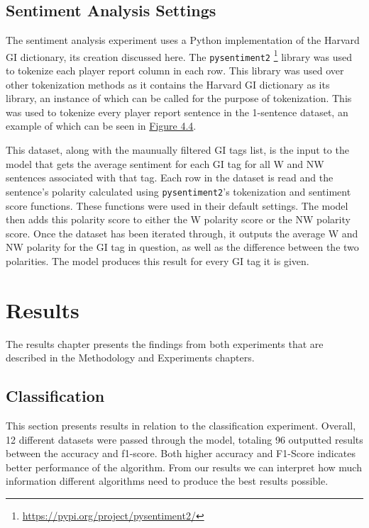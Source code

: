 \documentclass[oneside,12pt]{Classes/RoboticsLaTeX}
\begin{document}
\section{Sentiment Analysis Settings}
The sentiment analysis experiment uses a Python implementation of the Harvard GI dictionary, its creation discussed here. The \texttt{pysentiment2} \footnote{\url{https://pypi.org/project/pysentiment2/}} library was used to tokenize each player report column in each row. This library was used over other tokenization
methods as it contains the Harvard GI dictionary as its library, an instance of which can be called for the purpose of tokenization. This was used to tokenize every player report sentence in the 1-sentence dataset, an example of which can be seen in  \hyperref[fig:1-sentence_gi_tag_example]{Figure 4.4}. \par
This dataset, along with the maunually filtered GI tags list, is the input to the model that gets the average sentiment for each GI tag for all W and NW sentences associated with that tag. Each row in the dataset is read and the sentence's polarity calculated using \texttt{pysentiment2}'s tokenization and sentiment score
functions. These functions were used in their default settings. The model then adds this polarity score to either the W polarity score or the NW polarity score. Once the dataset has been iterated through, it outputs the average W and NW polarity for the GI tag in question, as well as the difference between the two polarities. 
The model produces this result for every GI tag it is given.

\chapter{Results}
\label{chap:results}
The results chapter presents the findings from both experiments that are described in the Methodology and Experiments chapters.
\section{Classification}
This section presents results in relation to the classification experiment. Overall, 12 different datasets were passed through the model, totaling 96 outputted results between the accuracy and f1-score. 
Both higher accuracy and F1-Score indicates better performance of the algorithm. From our results we can interpret how much information different algorithms need to produce the best results possible.\par
\end{document}
